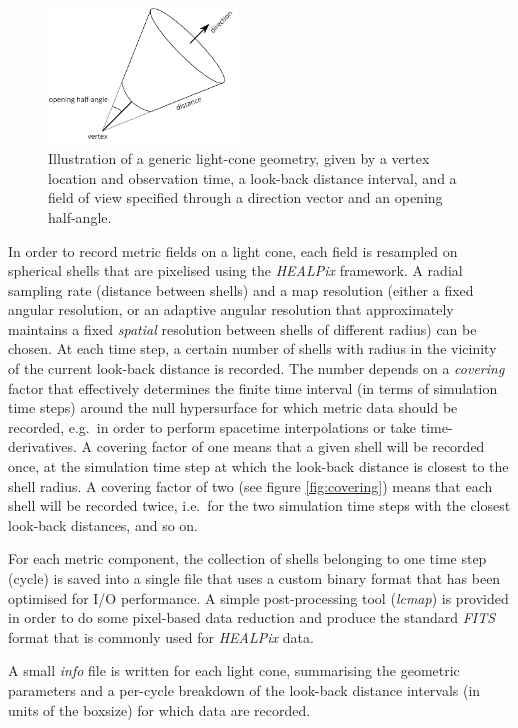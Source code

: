\documentclass[a4paper,10pt]{article}
\begin{document}
\begin{figure}
\label{fig:pencilbeam}
 \includegraphics[width=0.45\textwidth]{pencilbeam}
 \caption{\small Illustration of a generic light-cone geometry, given by a vertex location and observation time, a look-back distance interval, and a
 field of view specified through a direction vector and an opening half-angle.}
\end{figure}

In order to record metric fields on a light cone, each field is resampled on spherical shells that are pixelised using the \textit{HEALPix} framework.
A radial sampling rate (distance between shells) and a map resolution (either a fixed angular resolution, or an adaptive angular resolution that approximately
maintains a fixed \textit{spatial} resolution between shells of different radius) can be chosen. At each time step, a certain number of shells with
radius in the vicinity of the current look-back distance is recorded. The number depends on a \textit{covering} factor that effectively determines the finite
time interval (in terms of simulation time steps) around the null hypersurface for which metric data should be recorded, e.g.\ in order to perform spacetime
interpolations or take time-derivatives. A covering factor of one means that a given shell will be recorded once, at the simulation time step at which the
look-back distance is closest to the shell radius. A covering factor of two (see figure \ref{fig:covering}) means that each shell will be recorded twice,
i.e.\ for the two simulation time steps with the closest look-back distances, and so on.

For each metric component, the collection of shells belonging to one time step (cycle) is saved into a single file that uses a custom binary format that has been
optimised for I/O performance. A simple post-processing tool (\textit{lcmap}) is provided in order to do some pixel-based data reduction and produce the standard
\textit{FITS} format that is commonly used for \textit{HEALPix} data.

A small \textit{info} file is written for each light cone, summarising the geometric parameters and a per-cycle breakdown of the look-back distance intervals
(in units of the boxsize) for which data are recorded.
\end{document}
